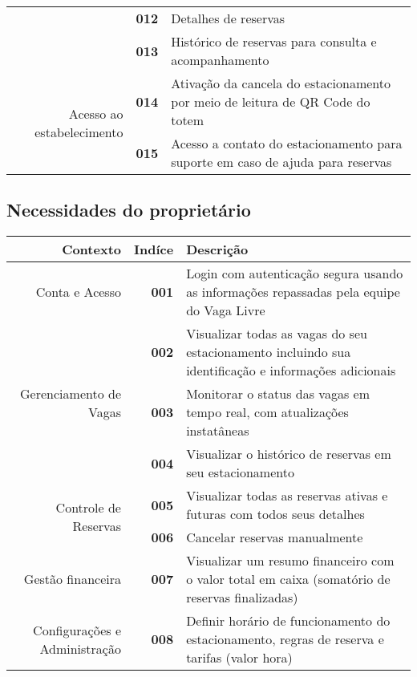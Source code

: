 \documentclass[a4paper,12pt]{article}
\begin{document}
\begin{table}[H]
\begin{tabularx}{\linewidth}{ | r | r | X | }
            & \bf{012} & Detalhes de reservas \\ \cline{2-3}
            & \bf{013} & Histórico de reservas para consulta e acompanhamento \\ \hline
        \multirow{2}{7.5em}{Acesso ao estabelecimento}
            & \bf{014} & Ativação da cancela do estacionamento por meio de leitura de QR Code do totem \\ \cline{2-3}
            & \bf{015} & Acesso a contato do estacionamento para suporte em caso de ajuda para reservas \\
        \hline
    \end{tabularx}
\end{table}

\subsection{Necessidades do proprietário}

\begin{table}[H]
    \begin{tabularx}{\linewidth}{ | r | r | X | }
        \hline
         Contexto & \bf{Indíce} & \bf{Descrição} \\
        \hline
        \multirow{1}{7.5em}{Conta e Acesso}
            & \bf{001} & Login com autenticação segura usando as informações repassadas pela equipe do Vaga Livre \\ \hline
        \multirow{3}{7.5em}{Gerenciamento de Vagas}
            & \bf{002} & Visualizar todas as vagas do seu estacionamento incluindo sua identificação e informações adicionais \\ \cline{2-3}
            & \bf{003} & Monitorar o status das vagas em tempo real, com atualizações instatâneas \\ \cline{2-3}
            & \bf{004} & Visualizar o histórico de reservas em seu estacionamento \\ \hline
        \multirow{2}{7.5em}{Controle de Reservas}
            & \bf{005} & Visualizar todas as reservas ativas e futuras com todos seus detalhes \\ \cline{2-3}
            & \bf{006} & Cancelar reservas manualmente \\ \hline
        \multirow{1}{7.5em}{Gestão financeira}
            & \bf{007} & Visualizar um resumo financeiro com o valor total em caixa (somatório de reservas finalizadas) \\ \hline
        \multirow{1}{7.5em}{Configurações e Administração}
            & \bf{008} & Definir horário de funcionamento do estacionamento, regras de reserva e tarifas (valor hora) \\ 
        \hline
    \end{tabularx}
\end{table}
\end{document}
